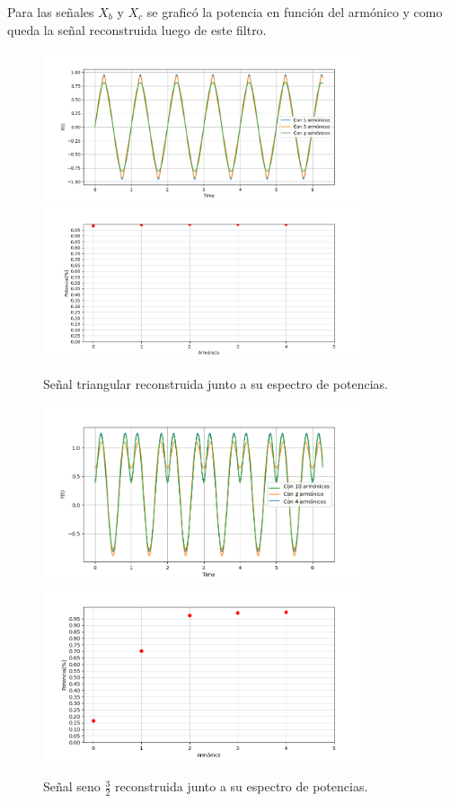 Para las señales $X_b$ y $X_c$ se graficó la potencia en función del armónico y como queda la señal reconstruida  luego de este filtro.
\begin{figure}[H]
	\centering
	\includegraphics[width=0.85\textwidth]{ImagenesEjercicio2/10Armonicos.PNG}
	\includegraphics[width=0.85\textwidth]{ImagenesEjercicio2/4ARMONICOS.PNG}
	\caption{Señal triangular reconstruida junto a su espectro de potencias.}
	\label{fig:pottriang}
\end{figure}
\begin{figure}[H]
	\centering
	\includegraphics[width=0.85\textwidth]{ImagenesEjercicio2/sen32signal.PNG}
	\includegraphics[width=0.85\textwidth]{ImagenesEjercicio2/sen32signalpot.PNG}
	\caption{Señal seno $\frac{3}{2}$ reconstruida junto a su espectro de potencias.}
	\label{fig:potsin}
\end{figure}

